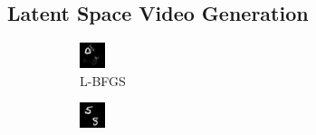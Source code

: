 \documentclass[10pt,twocolumn,letterpaper]{article}
\begin{document}
\subsection{Latent Space Video Generation}
\begin{figure}[]
	\begin{subfigure}[b]{0.11\textwidth}
		\centering
		\includegraphics[width=\textwidth]{graphics/backprojection/bfgs/0.png}
		\caption{L-BFGS}
	\end{subfigure}
	\begin{subfigure}[b]{0.11\textwidth}
		\centering
		\includegraphics[width=\textwidth]{graphics/backprojection/pnet/0.png}

\end{subfigure}
\end{figure}
\end{document}
